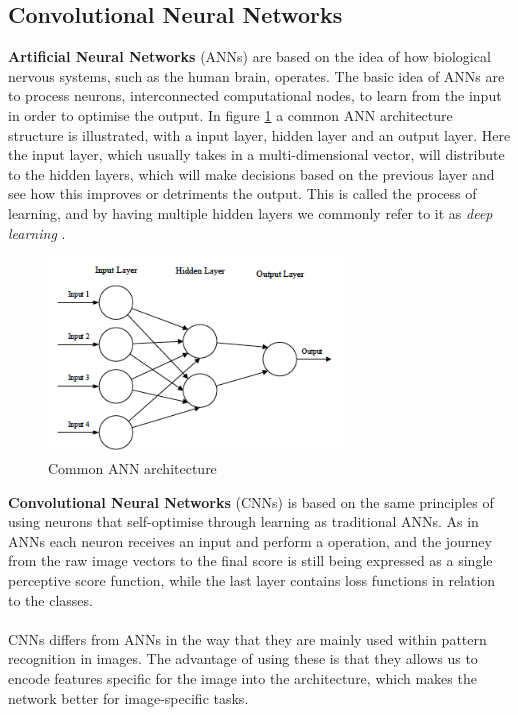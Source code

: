 \subsection{Convolutional Neural Networks}
\textbf{Artificial Neural Networks} (ANNs) are based on the idea of how biological nervous systems, such as the human brain, operates\cite{Keiron}. The basic idea of ANNs are to process neurons, interconnected computational nodes, to learn from the input in order to optimise the output. In figure \ref{fig:ann} a common ANN architecture structure is illustrated, with a input layer, hidden layer and an output layer. Here the input layer, which usually takes in a multi-dimensional vector, will distribute to the hidden layers, which will make decisions based on the previous layer and see how this improves or detriments the output. This is called the process of learning, and by having multiple hidden layers we commonly refer to it as \textit{deep learning} \cite{McClelland}.
\begin{figure}
    \centering
    \includegraphics[width=0.7\textwidth]{images/chap2/ANN.png}
    \caption{Common ANN architecture }
    \label{fig:ann}
\end{figure}
\textbf{Convolutional Neural Networks} (CNNs) is based on the same principles of using neurons that self-optimise through learning as traditional ANNs. As in ANNs each neuron receives an input and perform a operation, and the journey from the raw image vectors to the final score is still being expressed as a single perceptive score function, while the last layer contains loss functions in relation to the classes.\\\\
CNNs differs from ANNs in the way that they are mainly used within pattern recognition in images. The advantage of using these is that they allows us to encode features specific for the image into the architecture, which makes the network better for image-specific tasks.  
